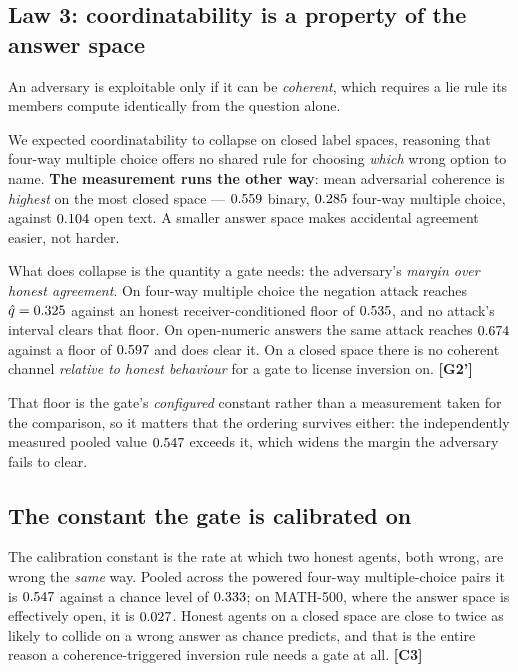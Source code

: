 \subsection{Law 3: coordinatability is a property of the answer space}

An adversary is exploitable only if it can be \emph{coherent}, which requires a
lie rule its members compute identically from the question alone.

We expected coordinatability to collapse on closed label spaces, reasoning that
four-way multiple choice offers no shared rule for choosing \emph{which} wrong
option to name. \textbf{The measurement runs the other way}: mean adversarial
coherence is \emph{highest} on the most closed space --- $0.559$
binary, $0.285$ four-way multiple choice, against
$0.104$ open text. A smaller answer space makes accidental
agreement easier, not harder.

What does collapse is the quantity a gate needs: the adversary's \emph{margin
over honest agreement}. On four-way multiple choice the negation attack reaches
$\hat q = 0.325$ against an honest receiver-conditioned floor of
$0.535$, and no attack's interval clears that floor. On
open-numeric answers the same attack reaches $0.674$ against a floor of
$0.597$ and does clear it. On a closed space there is no coherent
channel \emph{relative to honest behaviour} for a gate to license inversion on.
\textbf{[G2']}

That floor is the gate's \emph{configured} constant rather than a measurement
taken for the comparison, so it matters that the ordering survives either: the
independently measured pooled value $0.547$ exceeds it, which widens the
margin the adversary fails to clear.

\subsection{The constant the gate is calibrated on}

The calibration constant is the rate at which two honest agents, both wrong, are
wrong the \emph{same} way. Pooled across the powered four-way multiple-choice
pairs it is $0.547$ against a chance level of $0.333$; on
MATH-500, where the answer space is effectively open, it is
$0.027$. Honest agents on a closed space are close to twice as
likely to collide on a wrong answer as chance predicts, and that is the entire
reason a coherence-triggered inversion rule needs a gate at all. \textbf{[C3]}

